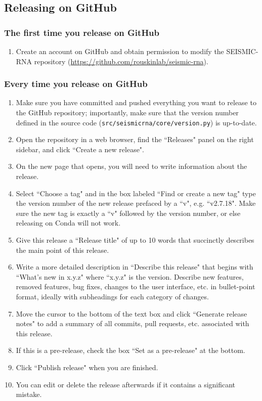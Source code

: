 \documentclass[main.tex]{subfiles}
\begin{document}
\subsection{Releasing on GitHub}

\subsubsection{The first time you release on GitHub}

\begin{enumerate}
    \item Create an account on GitHub and obtain permission to modify the SEISMIC-RNA repository (\url{https://github.com/rouskinlab/seismic-rna}).
\end{enumerate}


\subsubsection{Every time you release on GitHub}

\begin{enumerate}
    \item Make sure you have committed and pushed everything you want to release to the GitHub repository; importantly, make sure that the version number defined in the source code (\verb|src/seismicrna/core/version.py|) is up-to-date.
    \item Open the repository in a web browser, find the ``Releases" panel on the right sidebar, and click ``Create a new release".
    \item On the new page that opens, you will need to write information about the release.
    \item Select ``Choose a tag" and in the box labeled ``Find or create a new tag" type the version number of the new release prefaced by a ``v", e.g. ``v2.7.18". Make sure the new tag is exactly a ``v" followed by the version number, or else releasing on Conda will not work.
    \item Give this release a ``Release title" of up to 10 words that succinctly describes the main point of this release.
    \item Write a more detailed description in ``Describe this release" that begins with ``What's new in x.y.z" where ``x.y.z" is the version. Describe new features, removed features, bug fixes, changes to the user interface, etc. in bullet-point format, ideally with subheadings for each category of changes.
    \item Move the cursor to the bottom of the text box and click ``Generate release notes" to add a summary of all commits, pull requests, etc. associated with this release.
    \item If this is a pre-release, check the box ``Set as a pre-release" at the bottom.
    \item Click ``Publish release" when you are finished.
    \item You can edit or delete the release afterwards if it contains a significant mistake.
\end{enumerate}
\end{document}
